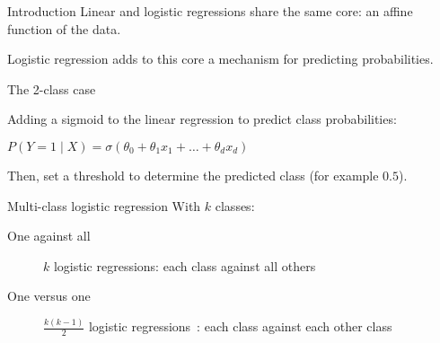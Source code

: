 \begin{frame}{Introduction}
  Linear and logistic regressions share the same core: an affine function of the data.
  
  Logistic regression adds to this core a mechanism for predicting probabilities.
\end{frame}

\begin{frame}{The 2-class case}
  \begin{center}
  \end{center}

  Adding a sigmoid to the linear regression to predict class probabilities:
  \begin{center}
    $P(Y = 1 \mid X) = \sigma(\theta_0 + \theta_1 x_1 + \dots + \theta_d x_d)$
  \end{center}

  Then, set a threshold to determine the predicted class (for example $0.5$).
\end{frame}

\begin{frame}{Multi-class logistic regression}
  With $k$ classes:

  \begin{description}
  \item[One against all] $k$ logistic regressions: each class against all others
  \item[One versus one] $\frac{k(k - 1)}{2}$ logistic regressions~: each class against each other class
  \end{description}
\end{frame}
